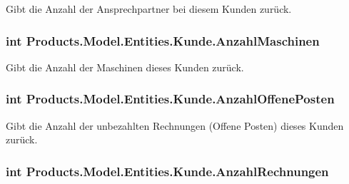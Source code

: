 Gibt die Anzahl der Ansprechpartner bei diesem Kunden zurück. 

\subsubsection[{\texorpdfstring{Anzahl\+Maschinen}{AnzahlMaschinen}}]{\setlength{\rightskip}{0pt plus 5cm}int Products.\+Model.\+Entities.\+Kunde.\+Anzahl\+Maschinen\hspace{0.3cm}{\ttfamily [get]}}\hypertarget{class_products_1_1_model_1_1_entities_1_1_kunde_aad68549551baab1fb9e42efdeb6e2368}{}\label{class_products_1_1_model_1_1_entities_1_1_kunde_aad68549551baab1fb9e42efdeb6e2368}


Gibt die Anzahl der Maschinen dieses Kunden zurück. 

\subsubsection[{\texorpdfstring{Anzahl\+Offene\+Posten}{AnzahlOffenePosten}}]{\setlength{\rightskip}{0pt plus 5cm}int Products.\+Model.\+Entities.\+Kunde.\+Anzahl\+Offene\+Posten\hspace{0.3cm}{\ttfamily [get]}}\hypertarget{class_products_1_1_model_1_1_entities_1_1_kunde_a6e6a1c6f1edae64cbd35511a210bdc08}{}\label{class_products_1_1_model_1_1_entities_1_1_kunde_a6e6a1c6f1edae64cbd35511a210bdc08}


Gibt die Anzahl der unbezahlten Rechnungen (Offene Posten) dieses Kunden zurück. 

\subsubsection[{\texorpdfstring{Anzahl\+Rechnungen}{AnzahlRechnungen}}]{\setlength{\rightskip}{0pt plus 5cm}int Products.\+Model.\+Entities.\+Kunde.\+Anzahl\+Rechnungen\hspace{0.3cm}{\ttfamily [get]}}\hypertarget{class_products_1_1_model_1_1_entities_1_1_kunde_acad22e5452380df00637219a9ecfd41a}{}\label{class_products_1_1_model_1_1_entities_1_1_kunde_acad22e5452380df00637219a9ecfd41a}


